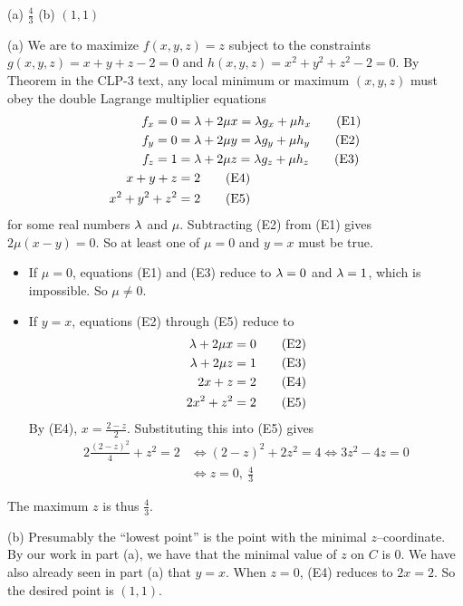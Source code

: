 \begin{answer}
(a) $\frac{4}{3}$\qquad
(b) $(1,1)$
\end{answer}

\begin{solution}
(a)
We are to maximize $f(x,y,z)=z$ subject to the constraints 
$g(x,y,z)=x+y+z-2=0$ and $h(x,y,z) = x^2 + y^2 + z^2 -2=0$.
By Theorem  in the CLP-3 text, 
any local minimum or maximum $(x,y,z)$ must obey the  double Lagrange 
multiplier equations
\begin{align*}
f_x = 0 &=\lambda + 2 \mu x = \lambda g_x +\mu h_x\tag{E1} \\ 
f_y = 0 &=\lambda + 2 \mu y = \lambda g_y +\mu h_y\tag{E2} \\ 
f_z = 1 &=\lambda + 2 \mu z = \lambda g_z +\mu h_z\tag{E3} \\ 
x + y + z &= 2\tag{E4} \\
x^2 + y^2 + z^2 &= 2 \tag{E5}
\end{align*}
for some real numbers $\lambda$ and $\mu$. Subtracting (E2) from (E1) gives
$2\mu(x-y)=0$. So at least one of $\mu=0$ and $y=x$ must be true.
\begin{itemize}
\item 
If $\mu=0$, equations (E1) and (E3) reduce to $\lambda=0$ and $\lambda=1$,
which is impossible. So $\mu\ne 0$.
\item If $y=x$, equations (E2) through (E5) reduce to
\begin{align*}
\lambda + 2 \mu x &= 0 \tag{E2} \\ 
\lambda + 2 \mu z &= 1\tag{E3} \\ 
2x + z &= 2\tag{E4} \\
2x^2 + z^2 &= 2 \tag{E5}
\end{align*}
By (E4), $x=\frac{2-z}{2}$. Substituting this into (E5) gives
\begin{align*}
2\frac{(2-z)^2}{4} +z^2 =2
&\iff (2-z)^2 +2z^2 = 4
 \iff 3z^2-4z=0 \\
&\iff z = 0,\ \frac{4}{3}
\end{align*}
\end{itemize}
The maximum $z$ is thus $\frac{4}{3}$.

(b) Presumably the ``lowest point'' is the point with the minimal
$z$--coordinate. By our work in part (a), we have that the minimal
value of $z$ on $C$ is $0$. We have also already seen in part (a) that $y=x$.
When $z=0$, (E4) reduces to $2x=2$. So the desired point is
$
(1,1)
$.
\end{solution}

